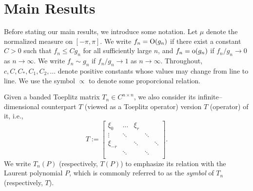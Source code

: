 \documentclass[12pt]{amsart}
\theoremstyle{plain}
\numberwithin{equation}{section}
\newcommand{\<}{\langle}
\renewcommand{\>}{\rangle}
\newcommand{\CC}[1]{\left[#1\right]}
\begin{document}

\section{Main Results}\label{sec:main.results}

Before stating our main results, we introduce some notation. Let $\mu$ denote the normalized measure on $[-\pi,\pi]$. We write $f_n=\textnormal{O}(g_n)$ if there exist a constant $C>0$ such that $f_n\leq C g_n$ for all sufficiently large $n$, and $f_n=\textnormal{o}(g_n)$ if $f_n/g_n\to0$ as $n\to\infty$. We write $f_n \sim g_n$ if $f_n/g_n \to 1$ as $n\to\infty$. Throughout, $c, C, C_{*},C_1, C_2,\ldots$ denote positive constants whose values may change from line to line. We use the symbol $\propto$ to denote some proporcional relation. 

Given a banded Toeplitz matrix $T_n \in C^{n\times n}$, we also consider its infinite--dimensional counterpart $T$ (viewed as a Toeplitz operator) version $T$ (operator) of it, i.e.,
\[
T :=
\CC{\begin{array}{ccccc}
\xi_{0} & \ldots & \xi_{r} &  &  \\
\vdots & \ddots &  & \ddots& \\
\xi_{-r} &  & \ddots & & \ddots \\
 & \ddots &  & \ddots & \\
\end{array}}.
\]
We write $T_n(P)$ (respectively, $T(P)$) to emphasize its relation with the Laurent polynomial $P$, which is commonly referred to as the {\it symbol} of $T_n$ (respectively, $T$).
\end{document}
